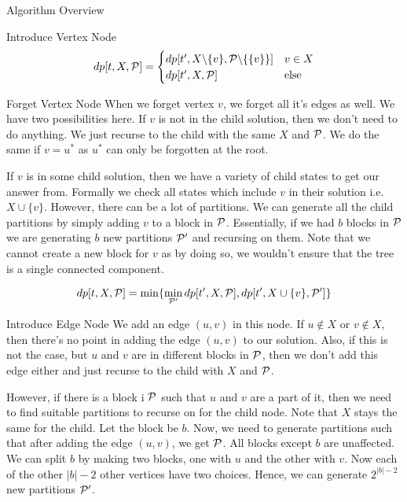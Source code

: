 \begin{section}{Algorithm Overview}
\begin{subsection}{Introduce Vertex Node}
		$$dp[t, X, \mathcal{P}] = 
		\begin{cases}
			dp[t', X \backslash \{v\}, \mathcal{P} \backslash \{\{v\}\}] & v \in X \\
			dp[t', X, \mathcal{P}] & \text{else}
		\end{cases}$$
		
	\end{subsection}

	\begin{subsection}{Forget Vertex Node}
		When we forget vertex $v$, we forget all it's edges as well. We have two possibilities here. If $v$ is not in the child solution, then we don't need to do anything. We just recurse to the child with the same $X$ and $\mathcal{P}$. We do the same if $v = u^*$ as $u^*$ can only be forgotten at the root. 
		
		If $v$ is in some child solution, then we have a variety of child states to get our answer from. Formally we check all states which include $v$ in their solution i.e. $X \cup \{v\}$. However, there can be a lot of partitions. We can generate all the child partitions by simply adding $v$ to a block in $\mathcal{P}$. Essentially, if we had $b$ blocks in $\mathcal{P}$ we are generating $b$ new partitions $\mathcal{P}'$ and recursing on them. Note that we cannot create a new block for $v$ as by doing so, we wouldn't ensure that the tree is a single connected component. 
		
		$$dp[t, X, \mathcal{P}] = 
		\min \{
			\min\limits_{\mathcal{P}'} dp[t', X, \mathcal{P}], dp[t', X \cup \{v\}, \mathcal{P}'] \}$$
	\end{subsection}


	\begin{subsection}{Introduce Edge Node}
		We add an edge $(u, v)$ in this node. If $u \notin X$ or $v \notin X$, then there's no point in adding the edge $(u, v)$ to our solution. Also, if this is not the case, but $u$ and $v$ are in different blocks in $\mathcal{P}$, then we don't add this edge either and just recurse to the child with $X$ and $\mathcal{P}$. 
		
		However, if there is a block i $\mathcal{P}$ such that $u$ and $v$ are a part of it, then we need to find suitable partitions to recurse on for the child node. Note that $X$ stays the same for the child. Let the block be $b$. Now, we need to generate partitions such that after adding the edge $(u, v)$, we get $\mathcal{P}$. All blocks except $b$ are unaffected. We can split $b$ by making two blocks, one with $u$ and the other with $v$. Now each of the other $|b|-2$ other vertices have two choices. Hence, we can generate $2^{|b|-2}$ new partitions $\mathcal{P}'$. 
		

\end{subsection}
\end{section}
